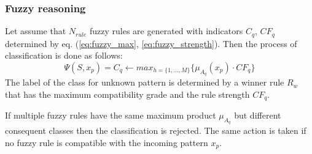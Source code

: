 \subsubsection{Fuzzy reasoning}
\label{cha:Fuzzy_reasoning}
Let assume that $N_{rule}$ fuzzy rules are generated with indicators $C_q$,
$CF_q$ determined by eq. (\ref{eq:fuzzy_max}, \ref{eq:fuzzy_strength}). Then
the process of classification is done as follows:
\begin{equation}
    \Psi(S, x_p) =  C_q \leftarrow max_{h=\{1,\ldots, M\}}\{\mu_{A_{q}}(x_p)\cdot CF_q\}
    \label{eq:fuzzy_classification}
\end{equation}
The label of the class for unknown pattern is determined by a winner rule $R_w$
that has the maximum compatibility grade and the rule strength $CF_q$.

If multiple fuzzy rules have the same maximum product $\mu_{A_q}$ but different
consequent classes then the classification is rejected. The same action is
taken if no fuzzy rule is compatible with the incoming pattern $x_p$. 
